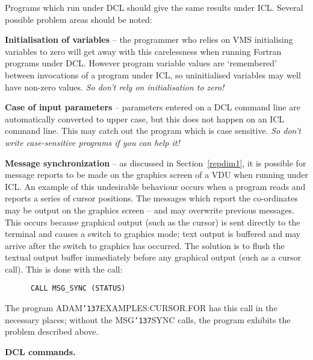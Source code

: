 \documentclass[twoside,11pt]{article}
\renewcommand{\_}{{\tt\char'137}}
\begin{document}
Programs which run under DCL should give the same results under ICL.
Several possible problem areas should be noted:
\begin{description}
\item{\bf Initialisation of variables} -- the programmer
who relies on VMS initialising variables to zero will get away with this
carelessness when running Fortran programs under DCL.
However program variable values are `remembered' between invocations
of a program under ICL, so uninitialised variables may well have
non-zero values. {\sl So don't rely on initialisation to zero!}

\item{\bf Case of input parameters} -- parameters entered on a DCL
command line are automatically converted to upper case, but this does not
happen on an ICL command line. This may catch out the program which is
case sensitive. {\sl So don't write case-sensitive programs if you can help
it!}

\item{\bf Message synchronization} -- as discussed in Section~\ref{repdim1},
it is possible for message reports to be
made on the graphics screen of a VDU when running under ICL.
An example of this undesirable behaviour occurs when a program reads
and reports a series of cursor positions.
The messages which report the co-ordinates may be output on the graphics
screen -- and may overwrite previous messages.
This occurs because graphical output (such as the cursor) is sent directly
to the terminal and causes a switch to graphics mode; text output is
buffered and may arrive after the switch to graphics has occurred.
The solution is to flush  the textual output buffer immediately before any
graphical output (such as a cursor call).
This is done with the call:
\begin{verbatim}
      CALL MSG_SYNC (STATUS)
\end{verbatim}
The program ADAM\_EXAMPLES:CURSOR.FOR has this call in the necessary places;
without the MSG\_SYNC calls, the program exhibits the problem described
above.
\end{description}

{\bigskip\large\bf DCL commands.}
\end{document}
